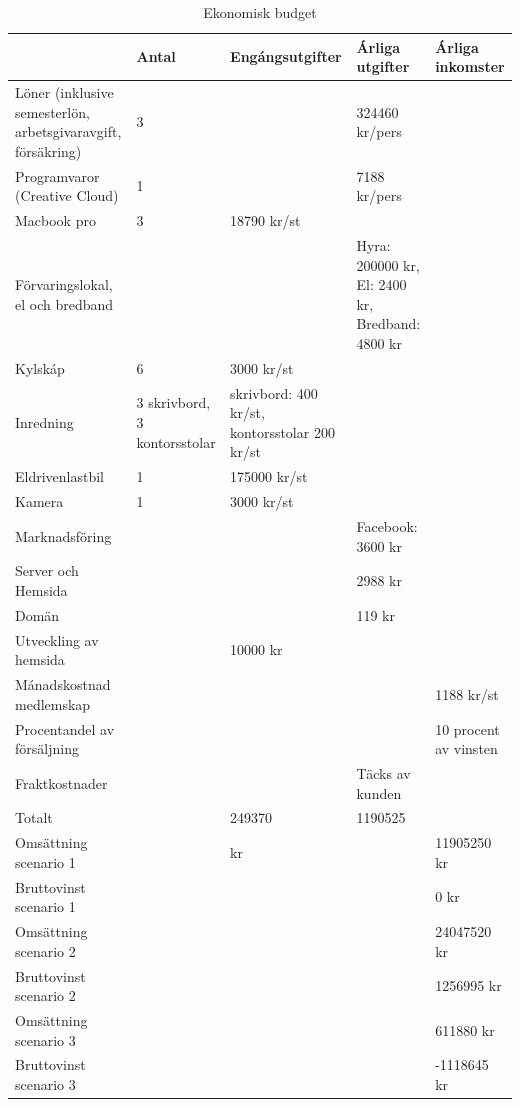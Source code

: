 \documentclass[10pt,a4paper,oneside]{article}
\begin{document}
\begin{table}[tb]
\centering
\begin{tabular}{ | p{3cm} | p{2cm} | p{2cm} | p{2cm} | p{2cm} |}
 \hline
  & Antal & Eng\'angsutgifter & \'Arliga utgifter & \'Arliga inkomster\\ \hline
L\"oner (inklusive semesterl\"on, arbetsgivaravgift, f\"ors\"akring) & 3 &  & 324460 kr/pers &  \\ \hline
Programvaror (Creative Cloud) &1 &  & 7188 kr/pers &  \\ \hline
Macbook pro  & 3 & 18790 kr/st &  &  \\ \hline
F\"orvaringslokal, el och bredband &  &  & Hyra: 200000 kr, El: 2400 kr, Bredband: 4800 kr & \\ \hline
Kylsk\'ap  & 6 & 3000 kr/st &  & \\ \hline
Inredning & 3 skrivbord, 3 kontorsstolar & skrivbord: 400 kr/st, kontorsstolar 200 kr/st &  & \\ \hline
Eldrivenlastbil & 1 & 175000 kr/st &  & \\ \hline
Kamera & 1 & 3000 kr/st &  & \\ \hline
Marknadsf\"oring &  &  & Facebook: 3600 kr & \\ \hline
Server och Hemsida &  &  & 2988 kr & \\ \hline
Dom\"an &  &  & 119 kr & \\ \hline
Utveckling av hemsida &  & 10000 kr &  & \\ \hline
M\'anadskostnad medlemskap  &  &  &  & 1188 kr/st\\ \hline
Procentandel av f\"ors\"aljning  &  &  &  & 10 procent av vinsten\\ \hline
Fraktkostnader &  &  & T\"acks av kunden & \\ \hline
Totalt &  & 249370 & 1190525 & \\ \hline
Oms\"attning
scenario 1 &  &  kr &  & 11905250 kr\\ \hline
Bruttovinst scenario 1 &  &  &  & 0 kr\\ \hline
Oms\"attning scenario 2 &  &  &  & 24047520 kr\\ \hline
Bruttovinst
scenario 2 &  &  &  & 1256995 kr\\ \hline
Oms\"attning scenario 3 &  &  &  & 611880 kr\\ \hline
Bruttovinst scenario 3 &  &  &  & -1118645 kr\\ \hline

\end{tabular}
\caption{\label{tab:one} Ekonomisk budget}
\end{table}
\end{document}

